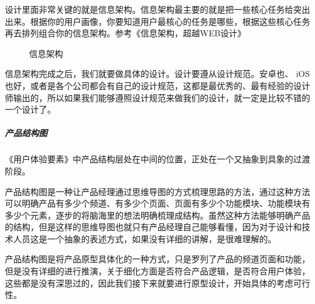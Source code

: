 \documentclass[letterpaper,10pt,english]{sphinxmanual}
\begin{document}
设计里面非常关键的就是信息架构。信息架构最主要的就是把一些核心任务给突出出来。根据你的用户画像，你要知道用户最核心的任务是哪些，根据这些核心任务再去排列组合你的信息架构。参考《信息架构，超越WEB设计》%
\begin{footnote}[596]\sphinxAtStartFootnote
{}
%
\end{footnote}

\begin{figure}[H]
\centering
\capstart

\noindent{}
\caption{信息架构}\label{\detokenize{chapter_knowledge/flow_chart:id49}}\end{figure}

信息架构完成之后，我们就要做具体的设计。设计要遵从设计规范。安卓也、
iOS也好，或者是各个公司都会有自己的设计规范，这都是最优秀的、最有经验的设计师输出的，所以如果我们能够遵照设计规范来做我们的设计，就一定是比较不错的一个设计了。
%
\begin{footnote}[597]\sphinxAtStartFootnote
{}
%
\end{footnote}


\subparagraph{产品结构图}
\label{\detokenize{chapter_knowledge/flow_chart:id33}}
《用户体验要素》中产品结构层处在中间的位置，正处在一个又抽象到具象的过渡阶段。%
\begin{footnote}[598]\sphinxAtStartFootnote
{}
%
\end{footnote}

产品结构图是一种让产品经理通过思维导图的方式梳理思路的方法，通过这种方法可以明确产品有多少个频道、有多少个页面、页面有多少个功能模块、功能模块有多少个元素，逐步的将脑海里的想法明确梳理成结构。虽然这种方法能够明确产品的结构，但是这样的思维导图也就只有产品经理自己能够看懂，因为对于设计和技术人员这是一个抽象的表述方式，如果没有详细的讲解，是很难理解的。

产品结构图是将产品原型具体化的一种方式，只是罗列了产品的频道页面和功能，但是没有详细的进行推演，关于细化方面是否符合产品逻辑，是否符合用户体验，这些都是没有深思过的，因此我们接下来就要进行原型设计，开始具体的考虑可行性。%
\begin{footnote}[599]\sphinxAtStartFootnote
{}
%
\end{footnote}
\end{document}
